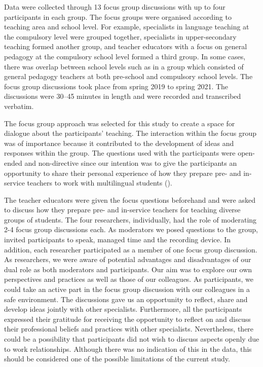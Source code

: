\documentclass[output=paper]{langscibook}
\begin{document}
Data were collected through 13 focus group discussions with up to four participants in each group. The focus groups were organised according to teaching area and school level. For example, specialists in language teaching at the compulsory level were grouped together, specialists in upper-secondary teaching formed another group, and teacher educators with a focus on general pedagogy at the compulsory school level formed a third group. In some cases, there was overlap between school levels such as in a group which consisted of general pedagogy teachers at both pre-school and compulsory school levels. The focus group discussions took place from spring 2019 to spring 2021. The discussions were 30–45 minutes in length and were recorded and transcribed verbatim.

The focus group approach was selected for this study to create a space for dialogue about the participants’ teaching. The interaction within the focus group was of importance because it contributed to the development of ideas and responses within the group. The questions used with the participants were open-ended and non-directive since our intention was to give the participants an opportunity to share their personal experience of how they prepare pre- and in-service teachers to work with multilingual students (\citealt{Bryman2004,EatoughSmith2017}).

The teacher educators were given the focus questions beforehand and were asked to discuss how they prepare pre- and in-service teachers for teaching diverse groups of students. The four researchers, individually, had the role of moderating 2-4 focus group discussions each. As moderators we posed questions to the group, invited participants to speak, managed time and the recording device. In addition, each researcher participated as a member of one focus group discussion. As researchers, we were aware of potential advantages and disadvantages of our dual role as both moderators and participants. Our aim was to explore our own perspectives and practices as well as those of our colleagues. As participants, we could take an active part in the focus group discussion with our colleagues in a safe environment. The discussions gave us an opportunity to reflect, share and develop ideas jointly with other specialists. Furthermore, all the participants expressed their gratitude for receiving the opportunity to reflect on and discuss their professional beliefs and practices with other specialists. Nevertheless, there could be a possibility that participants did not wish to discuss aspects openly due to work relationships. Although there was no indication of this in the data, this should be considered one of the possible limitations of the current study.
\end{document}
